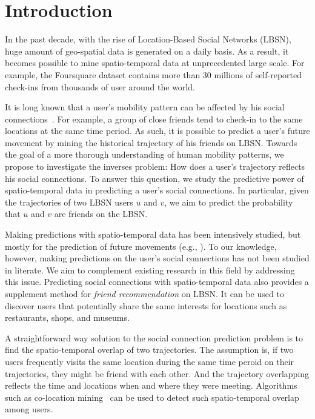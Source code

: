 \section{Introduction}\label{sec:intro}

In the past decade, with the rise of Location-Based Social Networks (LBSN), huge amount of geo-spatial data is generated on a daily basis. As a result, it becomes possible to mine spatio-temporal data at unprecedented large scale. For example, the Foursquare\cite{yang2015nationtelescope} dataset contains more than 30 millions of self-reported check-ins from thousands of user around the world. 

It is long known that a user's mobility pattern can be affected by his social connections~\cite{cho2011friendship, ye2013s}. For example, a group of close friends tend to check-in to the same locations at the same time period. As such, it is possible to predict a user's future movement by mining the historical trajectory of his friends on LBSN. Towards the goal of a more thorough understanding of human mobility patterns, we propose to investigate the inverses problem: How does a user's trajectory reflects his social connections. To answer this question, we study the predictive power of spatio-temporal data in predicting a user's social connections. In particular, given the trajectories of two LBSN users $u$ and $v$, we aim to predict the probability that $u$ and $v$ are friends on the LBSN.

Making predictions with spatio-temporal data has been intensively studied, but mostly for the prediction of future movements (e.g., \cite{cho2011friendship, noulas2012mining, gao2012mobile, scellato2011nextplace, lian2013collaborative}). To our knowledge, however, making predictions on the user's social connections has not been studied in literate. We aim to complement existing research in this field by addressing this issue. Predicting social connections with spatio-temporal data also provides a supplement method for \textit{friend recommendation} on LBSN. It can be used to discover users that potentially share the same interests for locations such as restaurants, shops, and museums.

A straightforward way solution to the social connection prediction problem is to find the spatio-temporal overlap of two trajectories. The assumption is, if two users frequently visits the same location during the same time peroid on their trajectories, they might be friend with each other. And the trajectory overlapping reflects the time and locations when and where they were meeting. Algorithms such as co-location mining~\cite{weiler2015geo} can be used to detect such spatio-temporal overlap among users. 

